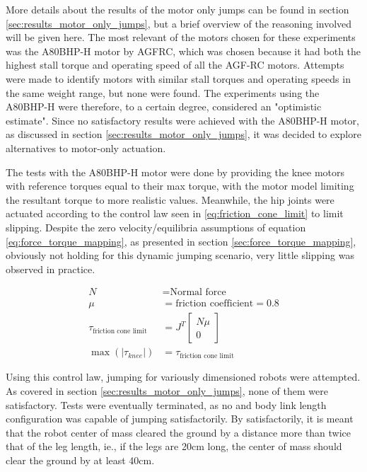 More details about the results of the motor only jumps can be found in section \ref{sec:results_motor_only_jumps}, but a brief overview of the reasoning involved will be given here. The most relevant of the motors chosen for these experiments was the A80BHP-H motor by AGFRC, which was chosen because it had both the highest stall torque and operating speed of all the AGF-RC motors. Attempts were made to identify motors with similar stall torques and operating speeds in the same weight range, but none were found. The experiments using the A80BHP-H were therefore, to a certain degree, considered an "optimistic estimate". Since no satisfactory results were achieved with the A80BHP-H motor, as discussed in section \ref{sec:results_motor_only_jumps}, it was decided to explore alternatives to motor-only actuation. 

The tests with the A80BHP-H motor were done by providing the knee motors with reference torques equal to their max torque, with the motor model limiting the resultant torque to more realistic values. Meanwhile, the hip joints were actuated according to the control law seen in \ref{eq:friction_cone_limit} to limit slipping. Despite the zero velocity/equilibria assumptions of equation \ref{eq:force_torque_mapping}, as presented in section \ref{sec:force_torque_mapping}, obviously not holding for this dynamic jumping scenario, very little slipping was observed in practice. 

\begin{align}
    N &= \text{Normal force} \\
    \mu &= \text{friction coefficient} = 0.8 \\
    \tau_{\text{friction cone limit}} &= J^T 
    \begin{bmatrix}
        N \mu \\
        0
    \end{bmatrix} \\
    \max(|\tau_{knee}|) &= \tau_{\text{friction cone limit}}
    \label{eq:friction_cone_limit}
\end{align}

Using this control law, jumping for variously dimensioned robots were attempted. As covered in section \ref{sec:results_motor_only_jumps}, none of them were satisfactory. Tests were eventually terminated, as no and body link length configuration was capable of jumping satisfactorily. By satisfactorily, it is meant that the robot center of mass cleared the ground by a distance more than twice that of the leg length, ie., if the legs are 20cm long, the center of mass should clear the ground by at least 40cm. 

